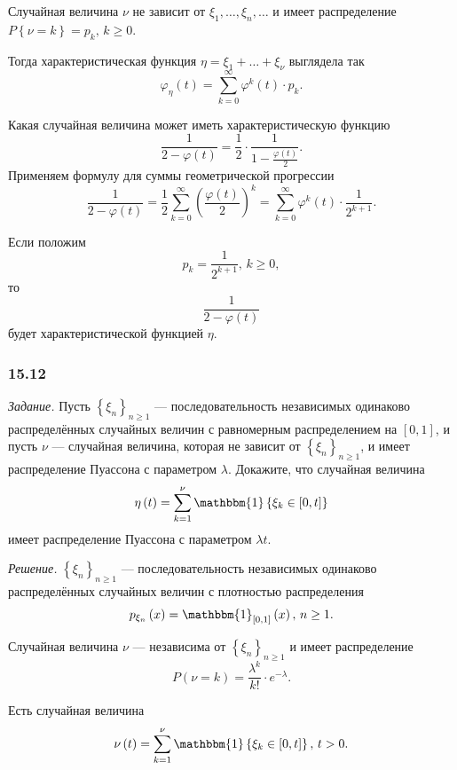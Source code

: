 \begin{enumerate}[label=\alph*)]
Случайная величина $ \nu $ не зависит от $ \xi_1, \dotsc, \xi_n, \dotsc $ и имеет распределение $P \left\{ \nu = k \right\} = p_k, \, k \geq 0$.

Тогда характеристическая функция $ \eta = \xi_1 + \dotsc + \xi_{ \nu }$ выглядела так
$$ \varphi_{ \eta } \left( t \right) =
\sum \limits_{k = 0}^{ \infty } \varphi^k \left( t \right) \cdot p_k.$$

Какая случайная величина может иметь характеристическую функцию
$$ \frac{1}{2 - \varphi \left( t \right) } =
\frac{1}{2} \cdot \frac{1}{1 - \frac{ \varphi \left( t \right) }{2}}.$$
Применяем формулу для суммы геометрической прогрессии
$$ \frac{1}{2 - \varphi \left( t \right) } =
\frac{1}{2} \sum \limits_{k = 0}^{ \infty } \left( \frac{ \varphi \left( t \right) }{2} \right)^k =
\sum \limits_{k = 0}^{ \infty } \varphi^k \left( t \right) \cdot \frac{1}{2^{k+1}}.$$

Если положим
$$p_k = \frac{1}{2^{k+1}}, \,
k \geq 0,$$
то
$$ \frac{1}{2 - \varphi \left( t \right) }$$
будет характеристической функцией $ \eta $.
\end{enumerate}

\subsubsection*{15.12}

\textit{Задание.}
Пусть $ \left\{ \xi_n \right\}_{n \geq 1}$ ---
последовательность независимых одинаково распределённых случайных величин с равномерным распределением на $ \left[ 0, 1 \right] $, и пусть $ \nu $ --- случайная величина,
которая не зависит от $ \left\{ \xi_n \right\}_{n \geq 1}$, и имеет распределение Пуассона с параметром $ \lambda $.
Докажите, что случайная величина
$$ \eta \left( t \right) =
\sum \limits_{k = 1}^{ \nu } \mathbbm{1} \left\{ \xi_k \in \left[ 0, t \right] \right\} $$
имеет распределение Пуассона с параметром $ \lambda t$.

\textit{Решение.}
$ \left\{ \xi_n \right\}_{n \geq 1}$ ---
последовательность независимых одинаково распределённых случайных величин с плотностью распределения
$$p_{ \xi_n} \left( x \right) = \mathbbm{1}_{ \left[ 0, 1 \right] } \left( x \right), \,
n \geq 1.$$

Случайная величина $ \nu $ --- независима от $ \left\{ \xi_n \right\}_{n \geq 1}$ и имеет распределение
$$P \left( \nu = k \right) =
\frac{ \lambda^k}{k!} \cdot e^{- \lambda }.$$

Есть случайная величина
$$ \nu \left( t \right) = \sum \limits_{k = 1}^{ \nu } \mathbbm{1} \left\{ \xi_k \in \left[ 0, t \right] \right\}, \,
t > 0.$$

